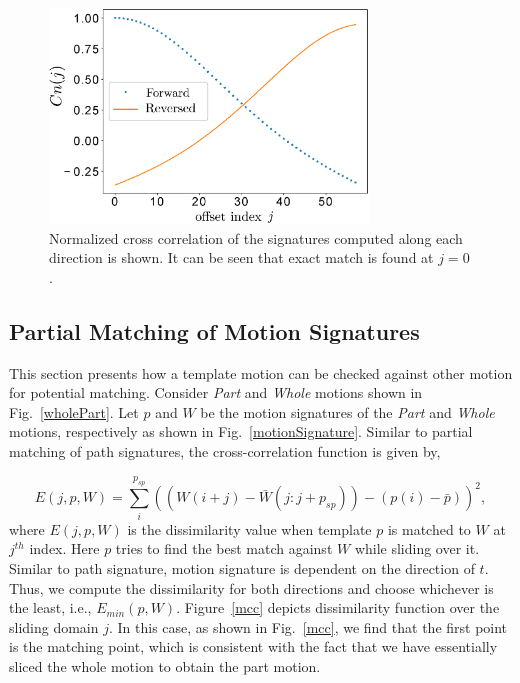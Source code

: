 \documentclass[twocolumn,10pt]{asme2ej}
\begin{document}
\begin{figure}
\centering
\includegraphics[width=240pt]{figure/fig_ncc.eps}
  \caption{Normalized cross correlation of the signatures computed along each direction is shown. It can be seen that exact match is found at $j=0$.}
\label{ncc}
\end{figure}

\subsection{Partial Matching of Motion Signatures}\label{sec_mcc}
This section presents how a template motion can be checked against other motion for potential matching.
Consider \emph{Part} and \emph{Whole} motions shown in Fig.~\ref{wholePart}.
Let $p$ and $W$ be the motion signatures of the \emph{Part} and \emph{Whole} motions, respectively as shown in Fig.~\ref{motionSignature}.
Similar to partial matching of path signatures, the cross-correlation function is given by,

\begin{equation}\label{mccEq}
  E(j, p, W) = \sum_{i}^{p_{sp}} {((W(i+j) - \bar{W}(j: j + p_{sp})) - (p(i) - \bar{p}))}^2,
\end{equation}
where $E(j, p, W)$ is the dissimilarity value when template $p$ is matched to $W$ at $j^{th}$ index. Here $p$ tries to find the best match against $W$ while sliding over it.
Similar to path signature, motion signature is dependent on the direction of $t$. Thus, we compute the dissimilarity for both directions and choose whichever is the least, i.e., $E_{min}(p, W)$.
Figure~\ref{mcc} depicts dissimilarity function over the sliding domain $j$.
In this case, as shown in Fig.~\ref{mcc}, we find that the first point is the matching point, which is consistent with the fact that we have essentially sliced the whole motion to obtain the part motion.
\end{document}
